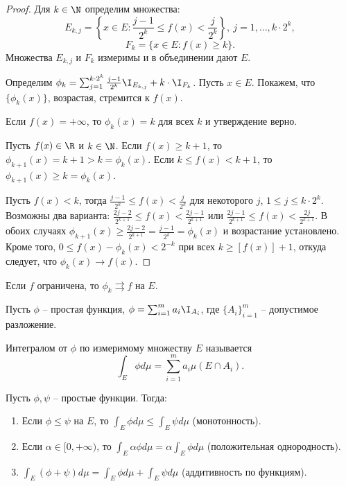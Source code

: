 \begin{proof}
    Для $k \in \N$ определим множества:
    \[E_{k, j} = \left\{x \in E: \frac{j - 1}{2^{k}} \leq f(x) < \frac{j}{2^{k}}\right\}, \ j = 1, \ldots, k\cdot2^{k},\]
    \[F_{k} = \{x \in E: f(x) \geq k\}.\]
    Множества $E_{k, j}$ и $F_{k}$ измеримы и в объединении дают $E$.

    Определим $\phi_{k} = \sum_{j = 1}^{k\cdot2^{k}}\frac{j - 1}{2^{k}}\I_{E_{k, j}} + k\cdot\I_{F_{k}}$. Пусть $x \in E$. Покажем, что $\{\phi_{k}(x)\}$, возрастая, стремится к $f(x)$.

    Если $f(x) = +\infty$, то $\phi_{k}(x) = k$ для всех $k$ и утверждение верно.

    Пусть $f(x) \in \R$ и $k \in \N$. Если $f(x) \geq k + 1$, то $\phi_{k + 1}(x) = k + 1 > k = \phi_{k}(x)$. Если $k \leq f(x) < k + 1$, то $\phi_{k + 1}(x) \geq k = \phi_{k}(x)$.

    Пусть $f(x) < k$, тогда $\frac{j - 1}{2^{k}} \leq f(x) < \frac{j}{2^{k}}$ для некоторого $j$, $1 \leq j \leq k\cdot2^{k}$. Возможны два варианта: $\frac{2j - 2}{2^{k + 1}} \leq f(x) < \frac{2j - 1}{2^{k + 1}}$ или $\frac{2j - 1}{2^{k + 1}} \leq f(x) < \frac{2j}{2^{k + 1}}$. В обоих случаях $\phi_{k + 1}(x) \geq \frac{2j - 2}{2^{k+1}} = \frac{j - 1}{2^{k}} = \phi_{k}(x)$ и возрастание установлено. Кроме того, $0 \leq f(x) - \phi_{k}(x) < 2^{-k}$ при всех $k \geq [f(x)] + 1$, откуда следует, что $\phi_{k}(x) \to f(x)$. 
\end{proof}

\begin{note}
    Если $f$ ограничена, то $\phi_{k} \rightrightarrows f$ на $E$.
\end{note}

\begin{definition}
    Пусть $\phi$ -- простая функция, $\phi = \sum_{i = 1}^{m}a_{i} \I_{A_{i}}$, где $\{A_{i}\}_{i = 1}^{m}$ -- допустимое разложение.

    Интегралом от $\phi$ по измеримому множеству $E$ называется
    \[\int_{E}\phi d\mu = \sum_{i = 1}^{m}a_{i}\mu(E \cap A_{i}).\]
\end{definition}

\begin{lemma}
    Пусть $\phi, \psi$ -- простые функции. Тогда:
    \begin{enumerate}
        \item Если $\phi \leq \psi$ на $E$, то $\int_{E}\phi d\mu \leq \int_{E}\psi d\mu$ (монотонность).
        \item Если $\alpha \in [0, +\infty)$, то $\int_{E}\alpha\phi d\mu = \alpha \int_{E}\phi d\mu$ (положительная однородность).
        \item $\int_{E}(\phi + \psi) d\mu = \int_{E}\phi d\mu + \int_{E}\psi d\mu$ (аддитивность по функциям).
    \end{enumerate}
\end{lemma}

